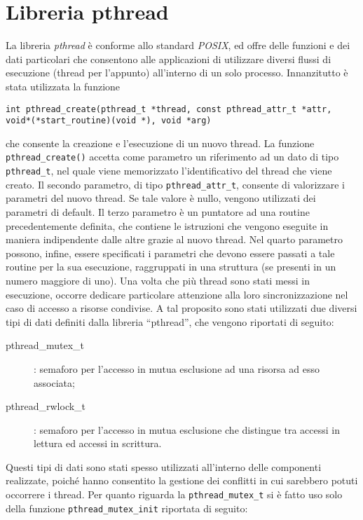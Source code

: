 \section{Libreria pthread}
La libreria \textit{pthread} è conforme allo standard \textit{POSIX}, ed offre delle funzioni e dei dati particolari che consentono alle applicazioni di utilizzare diversi flussi di esecuzione (thread per l’appunto) all’interno di un solo processo. 
Innanzitutto è stata utilizzata la funzione
\begin{center}
\texttt{int pthread\_create(pthread\_t *thread, const pthread\_attr\_t *attr, void*(*start\_routine)(void *), void *arg)}
\end{center}
che consente la creazione e l’esecuzione di un nuovo thread. La funzione \texttt{pthread\_create()} accetta come parametro un riferimento ad un dato di tipo \texttt{pthread\_t}, nel quale viene memorizzato l’identificativo del thread che viene creato. Il secondo parametro, di tipo \texttt{pthread\_attr\_t}, consente di valorizzare i parametri del nuovo thread. Se tale valore è nullo, vengono utilizzati dei parametri di default. Il terzo parametro è un puntatore ad una routine precedentemente definita, che contiene le istruzioni che vengono eseguite in maniera indipendente dalle altre grazie al nuovo thread. Nel quarto parametro possono, infine, essere specificati i parametri che devono essere passati a tale routine per la sua esecuzione, raggruppati in una struttura (se presenti in un numero maggiore di uno). Una volta che più thread sono stati messi in esecuzione, occorre dedicare particolare attenzione alla loro sincronizzazione nel caso di accesso a risorse condivise. A tal proposito sono stati utilizzati due diversi tipi di dati 
definiti dalla libreria “pthread”, che vengono riportati di seguito:
\begin{description}
\item[pthread\_mutex\_t]: semaforo per l’accesso in mutua esclusione ad una risorsa ad esso associata;
\item[pthread\_rwlock\_t]: semaforo per l'accesso in mutua esclusione che distingue tra accessi in lettura ed accessi in scrittura.
\end{description}
Questi tipi di dati sono stati spesso utilizzati all’interno delle componenti realizzate, poiché hanno consentito la gestione dei conflitti in cui sarebbero potuti occorrere i thread. Per quanto riguarda la \texttt{pthread\_mutex\_t} si è fatto uso solo della funzione \texttt{pthread\_mutex\_init} riportata di seguito:
